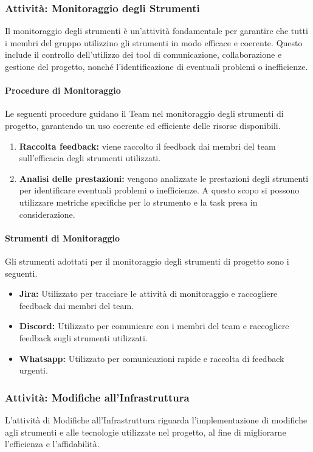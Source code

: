 \documentclass[a4paper,12pt]{article}
\begin{document}
\subsubsection{Attività: Monitoraggio degli Strumenti}
Il monitoraggio degli strumenti è un'attività fondamentale per garantire che tutti i membri del gruppo utilizzino gli strumenti in modo efficace e coerente. Questo include il controllo dell'utilizzo dei tool di comunicazione, collaborazione e gestione del progetto, nonché l'identificazione di eventuali problemi o inefficienze.
\paragraph{Procedure di Monitoraggio}
Le seguenti procedure guidano il Team nel monitoraggio degli strumenti di
progetto, garantendo un uso coerente ed efficiente delle risorse
disponibili.
\begin{enumerate}
    \item \textbf{Raccolta feedback:} viene raccolto il feedback dai membri del team sull'efficacia degli strumenti utilizzati.
    \item \textbf{Analisi delle prestazioni:} vengono analizzate le prestazioni degli strumenti per identificare eventuali problemi o inefficienze. A questo scopo si possono utilizzare metriche specifiche per lo strumento e la task presa in considerazione.
\end{enumerate}
\paragraph{Strumenti di Monitoraggio}
Gli strumenti adottati per il monitoraggio degli strumenti di progetto sono i seguenti.
\begin{itemize}
    \item \textbf{Jira:} Utilizzato per tracciare le attività di monitoraggio e raccogliere feedback dai membri del team.
    \item \textbf{Discord:} Utilizzato per comunicare con i membri del team e raccogliere feedback sugli strumenti utilizzati.
    \item \textbf{Whatsapp:} Utilizzato per comunicazioni rapide e raccolta di feedback urgenti.
\end{itemize}

\subsubsection{Attività: Modifiche all'Infrastruttura}
L'attività di Modifiche all'Infrastruttura riguarda l'implementazione di
modifiche agli strumenti e alle tecnologie utilizzate nel progetto, al fine di
migliorarne l'efficienza e l'affidabilità.
\end{document}
